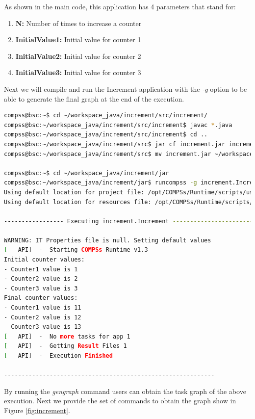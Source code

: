 As shown in the main code, this application has 4 parameters that stand for:

\begin{enumerate}
 \item \textbf{N:} Number of times to increase a counter
 \item \textbf{InitialValue1:} Initial value for counter 1
 \item \textbf{InitialValue2:} Initial value for counter 2
 \item \textbf{InitialValue3:} Initial value for counter 3
\end{enumerate}

Next we will compile and run the Increment application with the \textit{-g} option to be able to generate the final graph at the end of the execution.

\begin{lstlisting}[language=bash]
compss@bsc:~$ cd ~/workspace_java/increment/src/increment/
compss@bsc:~/workspace_java/increment/src/increment$ javac *.java
compss@bsc:~/workspace_java/increment/src/increment$ cd ..
compss@bsc:~/workspace_java/increment/src$ jar cf increment.jar increment
compss@bsc:~/workspace_java/increment/src$ mv increment.jar ~/workspace_java/increment/jar/

compss@bsc:~$ cd ~/workspace_java/increment/jar
compss@bsc:~/workspace_java/increment/jar$ runcompss -g increment.Increment 10 1 2 3
Using default location for project file: /opt/COMPSs/Runtime/scripts/user/../../configuration/xml/projects/project.xml
Using default location for resources file: /opt/COMPSs/Runtime/scripts/user/../../configuration/xml/resources/resources.xml

----------------- Executing increment.Increment --------------------------

WARNING: IT Properties file is null. Setting default values
[   API]  -  Starting COMPSs Runtime v1.3
Initial counter values:
- Counter1 value is 1
- Counter2 value is 2
- Counter3 value is 3
Final counter values:
- Counter1 value is 11
- Counter2 value is 12
- Counter3 value is 13
[   API]  -  No more tasks for app 1
[   API]  -  Getting Result Files 1
[   API]  -  Execution Finished

------------------------------------------------------------
\end{lstlisting}

By running the \textit{gengraph} command users can obtain the task graph of the above execution. Next we provide the set of commands to obtain the
graph show in Figure \ref{fig:increment}.

